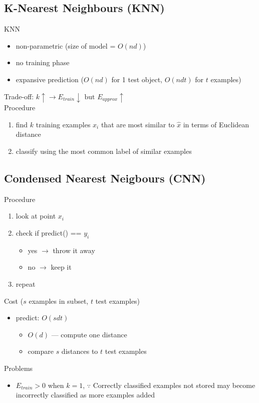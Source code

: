 \documentclass[10pt,landscape,a4paper]{article}
\begin{document}
\begin{multicols*}{5}
\section{K-Nearest Neighbours (KNN)}
KNN
\begin{itemize}
    \item non-parametric (size of model = \(O(nd)\))
    \item no training phase
    \item expansive prediction (\(O(nd)\) for 1 test object, \(O(ndt)\) for \(t\) examples)
\end{itemize}
Trade-off: \(k \uparrow \rightarrow E_{train} \downarrow \text{ but } E_{approx} \uparrow \) \\
Procedure
\begin{enumerate}
    \item find \(k\) training examples \(x_i\) that are most similar to \(\hat{x}\) in terms of Euclidean distance
    \item classify using the most common label of similar examples
\end{enumerate}

\subsection{Condensed Nearest Neigbours (CNN)}
Procedure
\begin{enumerate}
    \item look at point \(x_i\)
    \item check if predict() == \(y_i\)
    \begin{itemize}
        \item yes \(\rightarrow \) throw it away
        \item no \(\rightarrow \) keep it
    \end{itemize}
    \item repeat
\end{enumerate}
Cost (\(s\) examples in subset, \(t\) test examples)
\begin{itemize}
    \item predict: \(O(sdt)\)
    \begin{itemize}
        \item \(O(d)\) --- compute one distance
        \item compare \(s\) distances to \(t\) test examples
    \end{itemize}
\end{itemize}
Problems
\begin{itemize}
    \item \(E_{train} > 0\) when \(k=1\), \(\because \) Correctly classified examples not stored may become incorrectly classified as more examples added
\end{itemize}


\end{multicols*}
\end{document}
